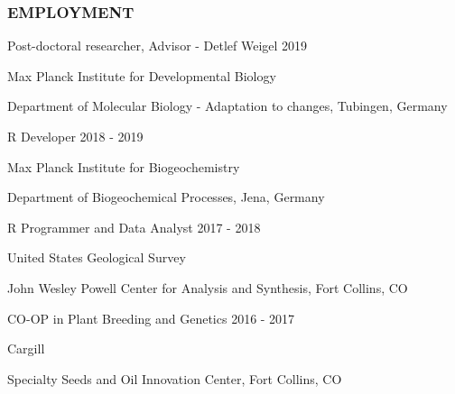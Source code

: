 \documentclass[12pt,english]{article}
\begin{document}

\subsubsection*{EMPLOYMENT}
\vspace{-0.5ex}\par

\hspace{1.0em} Post-doctoral researcher, Advisor - Detlef Weigel
\hfill
2019
\vspace{-0.5ex}\par
\hspace{2.0em} Max Planck Institute for Developmental Biology
\vspace{-0.5ex}\par
\hspace{2.0em} Department of Molecular Biology - Adaptation to changes, Tubingen, Germany
\hfill
\vspace{0.5em}\par

\hspace{1.0em} R Developer
\hfill
2018 - 2019
\vspace{-0.5ex}\par
\hspace{2.0em} Max Planck Institute for Biogeochemistry
\vspace{-0.5ex}\par
\hspace{2.0em} Department of Biogeochemical Processes, Jena, Germany
\hfill
\vspace{0.5em}\par

\hspace{1.0em} R Programmer and Data Analyst
\hfill
2017 - 2018
\vspace{-0.5ex}\par
\hspace{2.0em} United States Geological Survey
\vspace{-0.5ex}\par
\hspace{2.0em} John Wesley Powell Center for Analysis and Synthesis, Fort Collins, CO
\hfill
\vspace{0.5em}\par

\hspace{1.0em} CO-OP in Plant Breeding and Genetics
\hfill
2016 - 2017
\vspace{-0.5ex}\par
\hspace{2.0em} Cargill
\vspace{-0.5ex}\par
\hspace{2.0em} Specialty Seeds and Oil Innovation Center, Fort Collins, CO
\vspace{0.5em}\par
\end{document}
